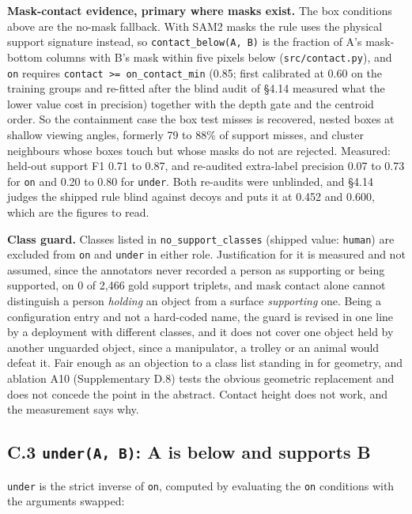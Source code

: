 \textbf{Mask-contact evidence, primary where masks exist.} The box conditions above are the no-mask fallback. With SAM2 masks the rule uses the physical support signature instead, so \texttt{contact\_\allowbreak{}below(A, B)} is the fraction of A's mask-bottom columns with B's mask within five pixels below (\texttt{src/contact.py}), and \texttt{on} requires \texttt{contact >= on\_\allowbreak{}contact\_\allowbreak{}min} (0.85; first calibrated at 0.60 on the training groups and re-fitted after the blind audit of \S{}4.14 measured what the lower value cost in precision) together with the depth gate and the centroid order. So the containment case the box test misses is recovered, nested boxes at shallow viewing angles, formerly 79 to 88\% of support misses, and cluster neighbours whose boxes touch but whose masks do not are rejected. Measured: held-out support F1 0.71 to 0.87, and re-audited extra-label precision 0.07 to 0.73 for \texttt{on} and 0.20 to 0.80 for \texttt{under}. Both re-audits were unblinded, and \S{}4.14 judges the shipped rule blind against decoys and puts it at 0.452 and 0.600, which are the figures to read.

\textbf{Class guard.} Classes listed in \texttt{no\_\allowbreak{}support\_\allowbreak{}classes} (shipped value: \texttt{human}) are excluded from \texttt{on} and \texttt{under} in either role. Justification for it is measured and not assumed, since the annotators never recorded a person as supporting or being supported, on 0 of 2,466 gold support triplets, and mask contact alone cannot distinguish a person \textit{holding} an object from a surface \textit{supporting} one. Being a configuration entry and not a hard-coded name, the guard is revised in one line by a deployment with different classes, and it does not cover one object held by another unguarded object, since a manipulator, a trolley or an animal would defeat it. Fair enough as an objection to a class list standing in for geometry, and ablation A10 (Supplementary D.8) tests the obvious geometric replacement and does not concede the point in the abstract. Contact height does not work, and the measurement says why.

\subsection{C.3 \texttt{under(A, B)}: A is below and supports B}

\texttt{under} is the strict inverse of \texttt{on}, computed by evaluating the \texttt{on} conditions with the arguments swapped:

